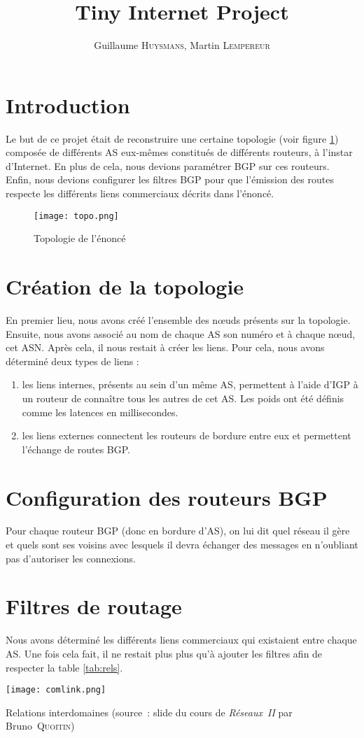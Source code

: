 \documentclass[10pt,a4paper,twocolumn]{article}
\title{Tiny Internet Project}
\author{Guillaume \textsc{Huysmans}, Martin \textsc{Lempereur}}
\begin{document}
\maketitle

\section{Introduction}
Le but de ce projet était de reconstruire une certaine topologie (voir figure \ref{fig:topo}) composée de différents AS eux-mêmes constitués de différents routeurs, à l'instar d'Internet. En plus de cela, nous devions paramétrer BGP sur ces routeurs. Enfin, nous devions configurer les filtres BGP pour que l'émission des routes respecte les différents liens commerciaux décrits dans l'énoncé.
\begin{figure}[h]
	\texttt{[image: topo.png]}
	\caption{Topologie de l'énoncé}
	\label{fig:topo}
\end{figure}

\section{Création de la topologie}
En premier lieu, nous avons créé l'ensemble des nœuds présents sur la topologie. Ensuite, nous avons associé au nom de chaque AS son numéro et à chaque nœud, cet ASN.
Après cela, il nous restait à créer les liens. Pour cela, nous avons déterminé deux types de liens :
\begin{enumerate}
	\item les liens internes, présents au sein d'un même AS, permettent à l'aide d'IGP à un routeur de connaître tous les autres de cet AS. Les poids ont été définis comme les latences en millisecondes.
	\item les liens externes connectent les routeurs de bordure entre eux et permettent l'échange de routes BGP.
\end{enumerate}

\section{Configuration des routeurs BGP}
Pour chaque routeur BGP (donc en bordure d'AS), on lui dit quel réseau il gère et quels sont ses voisins avec lesquels il devra échanger des messages en n'oubliant pas d'autoriser les connexions.

\section{Filtres de routage}
Nous avons déterminé les différents liens commerciaux qui existaient entre chaque AS. Une fois cela fait, il ne restait plus plus qu'à ajouter les filtres afin de respecter la table \ref{tab:rels}.
\begin{table}[h]
	\center
	\texttt{[image: comlink.png]}
	\caption{Relations interdomaines (source~: slide du cours de \textit{Réseaux~II} par Bruno~\textsc{Quoitin})}
	\label{tab:rels}
\end{table}
\end{document}

